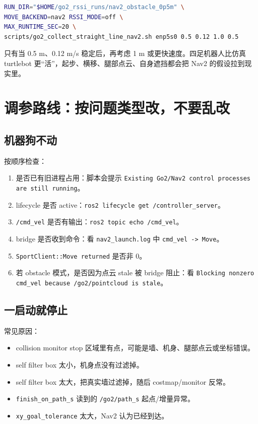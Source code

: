 \documentclass[UTF8,11pt,a4paper,openany]{ctexrep}
\newcommand{\code}[1]{\nolinkurl{#1}}
\newcommand{\topic}[1]{\nolinkurl{#1}}
\newcommand{\param}[1]{\nolinkurl{#1}}
\newcommand{\file}[1]{\nolinkurl{#1}}
\begin{document}
\begin{lstlisting}[language=bash]
RUN_DIR="$HOME/go2_rssi_runs/nav2_obstacle_0p5m" \
MOVE_BACKEND=nav2 RSSI_MODE=off \
MAX_RUNTIME_SEC=20 \
scripts/go2_collect_straight_line_nav2.sh enp5s0 0.5 0.12 1.0 0.5
\end{lstlisting}

只有当 0.5 m、0.12 m/s 稳定后，再考虑 1 m 或更快速度。四足机器人比仿真 turtlebot 更“活”，起步、横移、腿部点云、自身遮挡都会把 Nav2 的假设拉到现实里。

\chapter{调参路线：按问题类型改，不要乱改}
\label{chap:tuning}

\section{机器狗不动}

按顺序检查：

\begin{enumerate}
  \item 是否已有旧进程占用：脚本会提示 \code{Existing Go2/Nav2 control processes are still running}。
  \item lifecycle 是否 active：\code{ros2 lifecycle get /controller_server}。
  \item \topic{/cmd_vel} 是否有输出：\code{ros2 topic echo /cmd_vel}。
  \item bridge 是否收到命令：看 \file{nav2_launch.log} 中 \code{cmd_vel -> Move}。
  \item \code{SportClient::Move returned} 是否非 0。
  \item 若 obstacle 模式，是否因为点云 stale 被 bridge 阻止：看 \code{Blocking nonzero cmd_vel because /go2/pointcloud is stale}。
\end{enumerate}

\section{一启动就停止}

常见原因：

\begin{itemize}
  \item collision monitor stop 区域里有点，可能是墙、机身、腿部点云或坐标错误。
  \item self filter box 太小，机身点没有过滤掉。
  \item self filter box 太大，把真实墙过滤掉，随后 costmap/monitor 反常。
  \item \param{finish_on_path_s} 读到的 \topic{/go2/path_s} 起点/增量异常。
  \item \param{xy_goal_tolerance} 太大，Nav2 认为已经到达。
\end{itemize}
\end{document}
